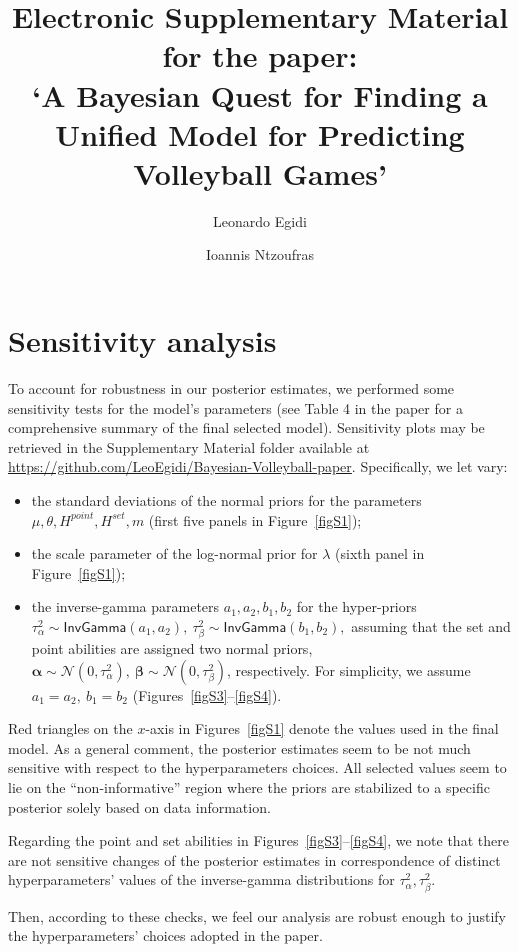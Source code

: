 \documentclass{statsoc}
\title[]{Electronic Supplementary Material for the paper:\\ `A Bayesian Quest for Finding a Unified Model for Predicting Volleyball Games'}
\author[Egidi and Ntzoufras]{Leonardo Egidi}
\author[Egidi and Ntzoufras]{Ioannis Ntzoufras}
\numberwithin{figure}{section}
\numberwithin{table}{section}
\begin{document}
\maketitle

\appendix 


\section{Sensitivity analysis}

To account for robustness in our posterior estimates, we performed some sensitivity tests for the model's parameters (see Table 4 in the paper for a comprehensive summary of the final selected model). Sensitivity plots may be retrieved in the Supplementary Material folder available at \url{https://github.com/LeoEgidi/Bayesian-Volleyball-paper}. Specifically, we let vary: 


\begin{itemize}
\item the standard deviations of the normal priors for the parameters $\mu, \theta, H^{point}, H^{set}, m$
(first five panels in Figure~\ref{figS1});
\item  the scale parameter of the log-normal prior for $\lambda$ (sixth panel in Figure~\ref{figS1});
\item the inverse-gamma parameters $a_1, a_2, b_1, b_2$ for the hyper-priors $\tau^2_{\alpha} \sim \mathsf{InvGamma}(a_1,a_2), \ \tau^2_{\beta} \sim \mathsf{InvGamma}(b_1,b_2),$ assuming that the set and point abilities are assigned two normal priors, $\bm{\alpha} \sim \mathcal{N}(0, \tau^2_{\alpha}),\ \bm{\beta} \sim \mathcal{N}(0, \tau^2_{\beta}) $, respectively. For simplicity, we assume $a_1=a_2,\ b_1=b_2$ (Figures~\ref{figS3}--\ref{figS4}).
\end{itemize}
%
Red triangles on the $x$-axis in Figures~\ref{figS1} denote the values used in the final model. As a general comment, the posterior estimates seem to be not much sensitive with respect to the hyperparameters choices. All selected values seem to lie on the ``non-informative'' region where the priors are stabilized to a specific posterior solely based on data information. 

Regarding the point and set abilities in Figures~\ref{figS3}--\ref{figS4}, we note that there are not sensitive changes of the posterior estimates in correspondence of distinct hyperparameters' values of the inverse-gamma distributions for $\tau^2_{\alpha}, \tau^2_{\beta}$.

Then, according to these checks, we feel our analysis are robust enough to justify the hyperparameters' choices adopted in the paper.
\end{document}
